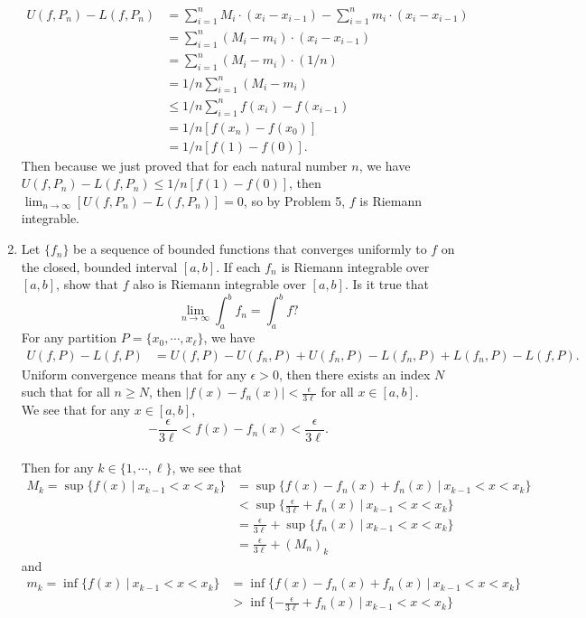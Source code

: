 \begin{enumerate}
\begin{align*}
        U(f,P_n)-L(f,P_n)&=\sum_{i=1}^n M_i\cdot (x_i-x_{i-1})-\sum_{i=1}^n m_i\cdot (x_i-x_{i-1})\\
        &=\sum_{i=1}^n (M_i-m_i)\cdot (x_i-x_{i-1})\\
        &=\sum_{i=1}^n (M_i-m_i)\cdot (1/n)\\
        &=1/n\sum_{i=1}^n (M_i-m_i)\\
        &\le1/n \sum_{i=1}^n f(x_i)-f(x_{i-1})\\
        &=1/n [f(x_n)-f(x_0)]\\
        &=1/n [f(1)-f(0)].
    \end{align*}
    Then because we just proved that for each natural number $n$, we have $U(f,P_n)-L(f,P_n)\le 1/n[f(1)-f(0)]$, then $\lim_{n\to\infty}[U(f,P_n)-L(f,P_n)]=0$, so by Problem 5, $f$ is Riemann integrable.
    \item Let $\{f_n\}$ be a sequence of bounded functions that converges uniformly to $f$ on the closed, bounded interval $[a,b]$. 
    If each $f_n$ is Riemann integrable over $[a,b]$, show that $f$ also is Riemann integrable over $[a,b]$. Is it true that
    \[
        \lim_{n\to\infty}\int_a^bf_n=\int_a^bf?  
    \]
    For any partition $P=\{x_0,\cdots,x_\ell\}$, we have 
    \begin{align*}
        U(f,P)-L(f,P)&=U(f,P)-U(f_n,P)+U(f_n,P)-L(f_n,P)+L(f_n,P)-L(f,P).
    \end{align*}
    Uniform convergence means that for any $\epsilon>0$, then there exists an index $N$ such that for all $n\ge N$, then $|f(x)-f_n(x)|<\frac{\epsilon}{3\ell}$ for all $x\in[a,b]$.
    \\We see that for any $x\in[a,b]$,
    \[
        -\frac{\epsilon}{3\ell}<f(x)-f_n(x)<\frac{\epsilon}{3\ell}.
    \]
    \\Then for any $k\in\{1,\cdots,\ell\}$, we see that
    \begin{align*}
        M_k=\sup\{f(x)\ |\ x_{k-1}<x<x_k\}&=\sup\{f(x)-f_n(x)+f_n(x)\ |\ x_{k-1}<x<x_k\}\\
        &<\sup\{\frac{\epsilon}{3\ell}+f_n(x)\ |\ x_{k-1}<x<x_k\}\\
        &=\frac{\epsilon}{3\ell}+\sup\{f_n(x)\ |\ x_{k-1}<x<x_k\}\\
        &=\frac{\epsilon}{3\ell}+(M_n)_k
    \end{align*}
    and 
    \begin{align*}
        m_k=\inf\{f(x)\ |\ x_{k-1}<x<x_k\}&=\inf\{f(x)-f_n(x)+f_n(x)\ |\ x_{k-1}<x<x_k\}\\
        &>\inf\{-\frac{\epsilon}{3\ell}+f_n(x)\ |\ x_{k-1}<x<x_k\}\\

\end{align*}
\end{enumerate}
